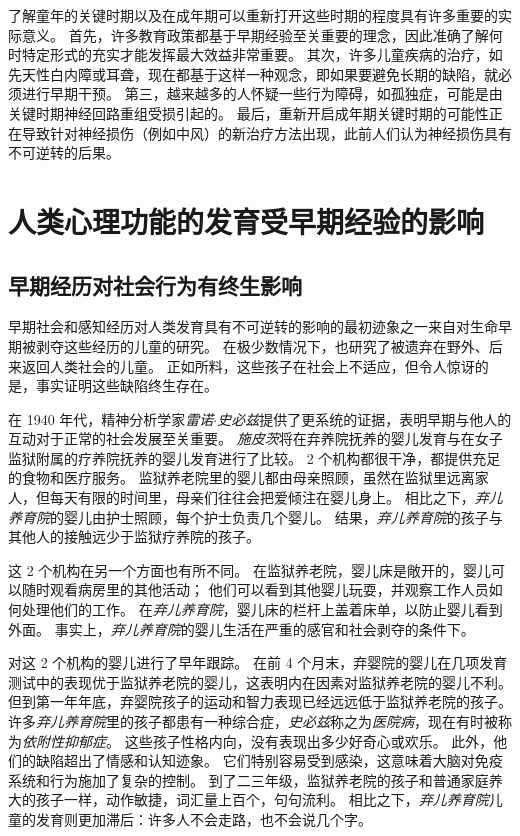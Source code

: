 了解童年的关键时期以及在成年期可以重新打开这些时期的程度具有许多重要的实际意义。
首先，许多教育政策都基于早期经验至关重要的理念，因此准确了解何时特定形式的充实才能发挥最大效益非常重要。
其次，许多儿童疾病的治疗，如先天性白内障或耳聋，现在都基于这样一种观念，即如果要避免长期的缺陷，就必须进行早期干预。
第三，越来越多的人怀疑一些行为障碍，如孤独症，可能是由关键时期神经回路重组受损引起的。
最后，重新开启成年期关键时期的可能性正在导致针对神经损伤（例如中风）的新治疗方法出现，此前人们认为神经损伤具有不可逆转的后果。



\section{人类心理功能的发育受早期经验的影响}

\subsection{早期经历对社会行为有终生影响}

早期社会和感知经历对人类发育具有不可逆转的影响的最初迹象之一来自对生命早期被剥夺这些经历的儿童的研究。
在极少数情况下，也研究了被遗弃在野外、后来返回人类社会的儿童。
正如所料，这些孩子在社会上不适应，但令人惊讶的是，事实证明这些缺陷终生存在。


在 1940 年代，精神分析学家\textit{雷诺$\cdot$史必兹}提供了更系统的证据，表明早期与他人的互动对于正常的社会发展至关重要。
\textit{施皮茨}将在弃养院抚养的婴儿发育与在女子监狱附属的疗养院抚养的婴儿发育进行了比较。
2 个机构都很干净，都提供充足的食物和医疗服务。
监狱养老院里的婴儿都由母亲照顾，虽然在监狱里远离家人，但每天有限的时间里，母亲们往往会把爱倾注在婴儿身上。
相比之下，\textit{弃儿养育院}的婴儿由护士照顾，每个护士负责几个婴儿。
结果，\textit{弃儿养育院}的孩子与其他人的接触远少于监狱疗养院的孩子。


这 2 个机构在另一个方面也有所不同。
在监狱养老院，婴儿床是敞开的，婴儿可以随时观看病房里的其他活动；
他们可以看到其他婴儿玩耍，并观察工作人员如何处理他们的工作。
在\textit{弃儿养育院}，婴儿床的栏杆上盖着床单，以防止婴儿看到外面。
事实上，\textit{弃儿养育院}的婴儿生活在严重的感官和社会剥夺的条件下。


对这 2 个机构的婴儿进行了早年跟踪。
在前 4 个月末，弃婴院的婴儿在几项发育测试中的表现优于监狱养老院的婴儿，这表明内在因素对监狱养老院的婴儿不利。
但到第一年年底，弃婴院孩子的运动和智力表现已经远远低于监狱养老院的孩子。
许多\textit{弃儿养育院}里的孩子都患有一种综合症，\textit{史必兹}称之为\textit{医院病}，现在有时被称为\textit{依附性抑郁症}。
这些孩子性格内向，没有表现出多少好奇心或欢乐。
此外，他们的缺陷超出了情感和认知迹象。
它们特别容易受到感染，这意味着大脑对免疫系统和行为施加了复杂的控制。
到了二三年级，监狱养老院的孩子和普通家庭养大的孩子一样，动作敏捷，词汇量上百个，句句流利。
相比之下，\textit{弃儿养育院}儿童的发育则更加滞后：许多人不会走路，也不会说几个字。


